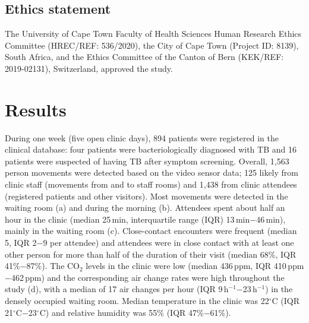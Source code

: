 \documentclass[fleqn,11pt]{wlscirep}
\begin{document}
\subsection*{Ethics statement}

The University of Cape Town Faculty of Health Sciences Human Research Ethics Committee (HREC/REF: 536/2020), the City of Cape Town (Project ID: 8139), South Africa, and the Ethics Committee of the Canton of Bern (KEK/REF: 2019-02131), Switzerland, approved the study.

\newpage

\section*{Results}

During one week (five open clinic days), 894 patients were registered in the clinical database: four patients were bacteriologically diagnosed with TB and 16 patients were suspected of having TB after symptom screening. Overall, 1,563 person movements were detected based on the video sensor data; 125 likely from clinic staff (movements from and to staff rooms) and 1,438 from clinic attendees (registered patients and other visitors). Most movements were detected in the waiting room (a) and during the morning (b). Attendees spent about half an hour in the clinic (median 25\,min, interquartile range (IQR) 13\,min$-$46\,min), mainly in the waiting room (c).  Close-contact encounters were frequent (median 5, IQR 2$-$9 per attendee) and attendees were in close contact with at least one other person for more than half of the duration of their visit (median 68\%, IQR 41\%$-$87\%). The CO$_2$ levels in the clinic were low (median 436\,ppm, IQR 410\,ppm$-$462\,ppm)  and the corresponding air change rates were high throughout the study (d), with a median of 17 air changes per hour (IQR 9\,h$^{-1}$$-$23\,h$^{-1}$) in the densely occupied waiting room.  Median temperature in the clinic was 22$^{\circ}$C (IQR 21$^{\circ}$C$-$23$^{\circ}$C) and relative humidity was 55\% (IQR 47\%$-$61\%).
\end{document}

